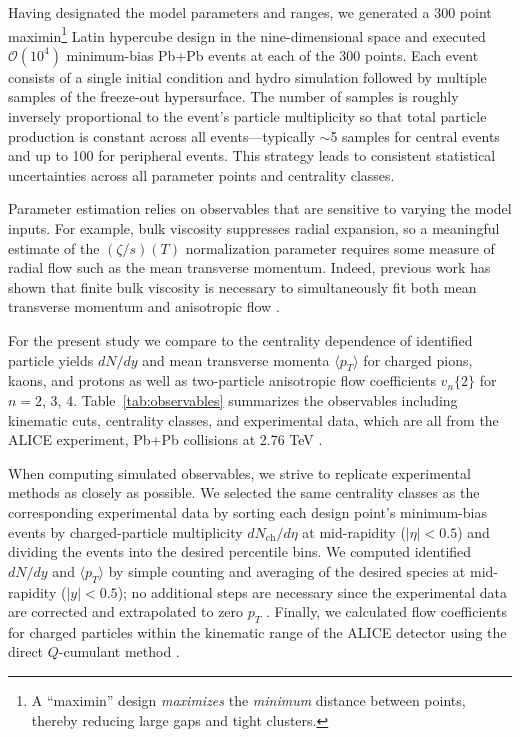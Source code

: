 \documentclass[aps,prc,reprint,amsmath,nofootinbib,superscriptaddress]{revtex4-1}
\newcommand{\avg}[1]{\langle #1 \rangle}
\newcommand{\nch}{N_\text{ch}}
\newcommand{\vnk}[2]{v_#1\{#2\}}
\newcommand{\order}[1]{$\mathcal O(10^{#1})$}
\begin{document}
Having designated the model parameters and ranges, we generated a 300 point maximin\footnote{A ``maximin'' design \emph{maximizes} the \emph{minimum} distance between points, thereby reducing large gaps and tight clusters.} Latin hypercube design \cite{Morris:1995lh} in the nine-dimensional space and executed \order 4 minimum-bias Pb+Pb events at each of the 300 points.
Each event consists of a single initial condition and hydro simulation followed by multiple samples of the freeze-out hypersurface.
The number of samples is roughly inversely proportional to the event's particle multiplicity so that total particle production is constant across all events---typically ${\sim}$5 samples for central events and up to 100 for peripheral events.
This strategy leads to consistent statistical uncertainties across all parameter points and centrality classes.

Parameter estimation relies on observables that are sensitive to varying the model inputs.
For example, bulk viscosity suppresses radial expansion, so a meaningful estimate of the $(\zeta/s)(T)$ normalization parameter requires some measure of radial flow such as the mean transverse momentum.
Indeed, previous work has shown that finite bulk viscosity is necessary to simultaneously fit both mean transverse momentum and anisotropic flow \cite{Ryu:2015vwa}.

For the present study we compare to the centrality dependence of identified particle yields $dN/dy$ and mean transverse momenta $\avg{p_T}$ for charged pions, kaons, and protons as well as two-particle anisotropic flow coefficients $\vnk n 2$ for $n = 2$, 3, 4.
Table~\ref{tab:observables} summarizes the observables including kinematic cuts, centrality classes, and experimental data, which are all from the ALICE experiment, Pb+Pb collisions at 2.76 TeV \cite{Abelev:2013vea,ALICE:2011ab}.

When computing simulated observables, we strive to replicate experimental methods as closely as possible.
We selected the same centrality classes as the corresponding experimental data by sorting each design point's minimum-bias events by charged-particle multiplicity $d\nch/d\eta$ at mid-rapidity ($|\eta| < 0.5$) and dividing the events into the desired percentile bins.
We computed identified $dN/dy$ and $\avg{p_T}$ by simple counting and averaging of the desired species at mid-rapidity ($|y| < 0.5$); no additional steps are necessary since the experimental data are corrected and extrapolated to zero $p_T$ \cite{Abelev:2013vea}.
Finally, we calculated flow coefficients for charged particles within the kinematic range of the ALICE detector using the direct $Q$-cumulant method \cite{Bilandzic:2010jr}.
\end{document}
